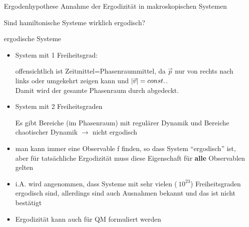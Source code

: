 \begin{prop}{Ergodenhypothese}
    Annahme der Ergodizität in makroskopischen Systemen
\end{prop}
Sind hamiltonische Systeme wirklich ergodisch?

\begin{beispiel}{ergodische Systeme}
    \begin{itemize}
    \item System mit 1 Freiheitsgrad:
\begin{center}
\end{center}
    offensichtlich ist Zeitmittel=Phasenraummittel, da $\Vec{p}$ nur von rechts nach links oder umgekehrt zeigen kann und $\abs{\Vec{v}} = const.$.\\
    Damit wird der gesamte Phasenraum durch abgedeckt.
    \item System mit 2 Freiheitsgraden

    \begin{center}
    \end{center}
    Es gibt Bereiche (im Phasenraum) mit regulärer Dynamik und Bereiche chaotischer Dynamik $\rightarrow$ nicht ergodisch
    \item man kann immer eine Observable f finden, so dass System \enquote{ergodisch} ist, aber für tatsächliche Ergodizität muss diese Eigenschaft für \textbf{alle} Observablen gelten
    \item i.A. wird angenommen, dass Systeme mit sehr vielen ($~10^{23}$) Freiheitsgraden ergodisch sind, allerdings sind auch Ausnahmen bekannt und das ist nicht bestätigt
    \item Ergodizität kann auch für QM formuliert werden
\end{itemize}
\end{beispiel}

